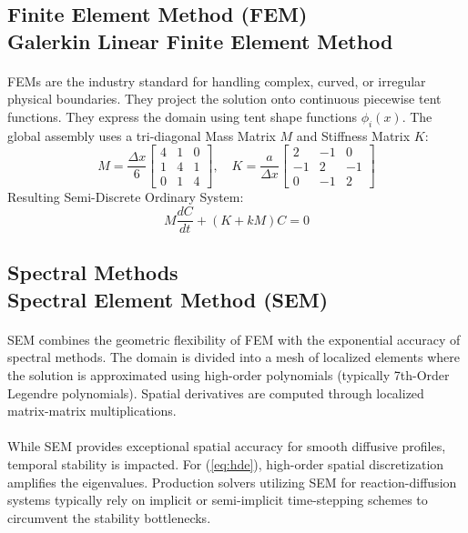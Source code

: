 \subsection*{Finite Element Method (FEM) \\ \normalsize Galerkin Linear Finite Element Method}
\paragraph{}
FEMs are the industry standard for handling complex, curved, or irregular physical boundaries. They project the solution onto continuous piecewise tent functions. They express the domain using tent shape functions $\phi_i(x)$. The global assembly uses a tri-diagonal Mass Matrix $M$ and Stiffness Matrix $K$:
\begin{equation*}
M = \frac{\Delta x}{6} \begin{bmatrix} 4 & 1 & 0 \\ 1 & 4 & 1 \\ 0 & 1 & 4 \end{bmatrix}, \quad K = \frac{a}{\Delta x} \begin{bmatrix} 2 & -1 & 0 \\ -1 & 2 & -1 \\ 0 & -1 & 2 \end{bmatrix}
\end{equation*}
Resulting Semi-Discrete Ordinary System:
\begin{equation*}
M \frac{dC}{dt} + (K + kM)C = 0
\end{equation*}

\subsection*{Spectral Methods\\ \normalsize Spectral Element Method (SEM)}
\paragraph{}
SEM combines the geometric flexibility of FEM with the exponential accuracy of spectral methods. The domain is divided into a mesh of localized elements where the solution is approximated using high-order polynomials (typically 7th-Order Legendre polynomials). Spatial derivatives are computed through localized matrix-matrix multiplications. 
\paragraph{}
While SEM provides exceptional spatial accuracy for smooth diffusive profiles,  temporal stability is impacted. For (\ref{eq:hde}), high-order spatial discretization amplifies the eigenvalues.  Production solvers utilizing SEM for reaction-diffusion systems typically rely on implicit or semi-implicit time-stepping schemes to circumvent the stability bottlenecks.

